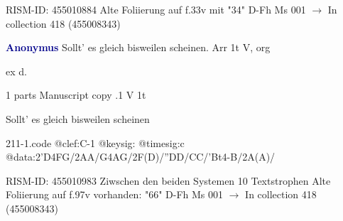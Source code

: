\documentclass[twocolumn]{book}
\begin{document}
\newline RISM-ID: 455010884
\newline Alte Foliierung auf f.33v mit "34"
\newline D-Fh  Ms 001
\newline $\rightarrow$ In collection 418 (455008343)

\newline \par \vspace{7pt} \textcolor{darkblue}{\textbf{Anonymus  }}
\newline Sollt' es gleich bisweilen scheinen. Arr  1t  
\newline V, org
\newline \begin{itshape}[f.97v, at left:] ex d.\end{itshape} 
\newline \textcolor{darkblue}{}  1 parts  
\newline Manuscript copy
.1  V  1t
\newline \begin{footnotesize} Sollt' es gleich bisweilen scheinen \end{footnotesize}  
\begin{filecontents*}{211-1.code}
@clef:C-1
@keysig:
@timesig:c
@data:2'D4FG/2AA/G4AG/2F(D)/''DD/CC/'Bt4-B/2A(A)/
\end{filecontents*}
\newline
%

\newline RISM-ID: 455010983
\newline Ziwschen den beiden Systemen 10 Textstrophen
\newline Alte Foliierung auf f.97v vorhanden: "66"
\newline D-Fh  Ms 001
\newline $\rightarrow$ In collection 418 (455008343)
\end{document}
